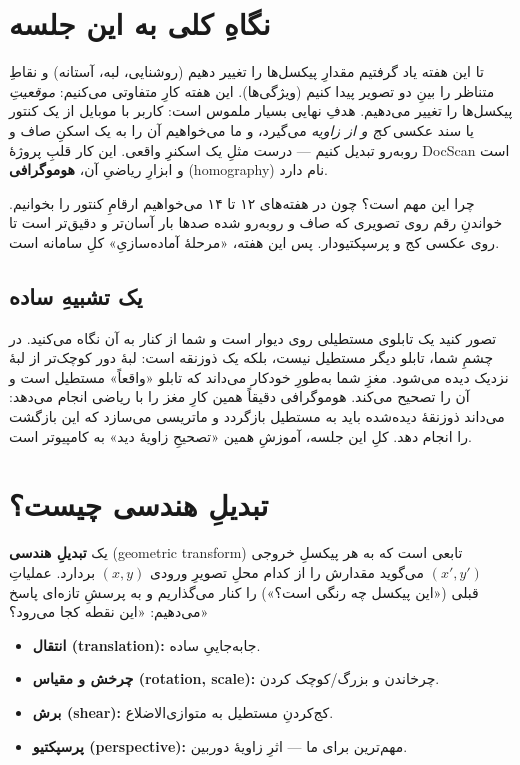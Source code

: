 \documentclass[12pt,a4paper]{article}
\begin{document}

\section*{نگاهِ کلی به این جلسه}

تا این هفته یاد گرفتیم مقدارِ پیکسل‌ها را تغییر دهیم (روشنایی، لبه، آستانه) و نقاطِ متناظر را بینِ دو تصویر پیدا کنیم (ویژگی‌ها). این هفته کارِ متفاوتی می‌کنیم: \emph{موقعیتِ} پیکسل‌ها را تغییر می‌دهیم. هدفِ نهایی بسیار ملموس است: کاربر با موبایل از یک کنتور یا سند عکسی \emph{کج و از زاویه} می‌گیرد، و ما می‌خواهیم آن را به یک اسکنِ صاف و روبه‌رو تبدیل کنیم — درست مثلِ یک اسکنرِ واقعی. این کار قلبِ پروژهٔ DocScan است و ابزارِ ریاضیِ آن، \textbf{هوموگرافی} (homography) نام دارد.

\begin{yaddasht}
چرا این مهم است؟ چون در هفته‌های ۱۲ تا ۱۴ می‌خواهیم ارقامِ کنتور را بخوانیم. خواندنِ رقم روی تصویری که صاف و روبه‌رو شده صدها بار آسان‌تر و دقیق‌تر است تا روی عکسی کج و پرسپکتیودار. پس این هفته، «مرحلهٔ آماده‌سازیِ» کلِ سامانه است.
\end{yaddasht}

\subsection*{یک تشبیهِ ساده}

تصور کنید یک تابلوی مستطیلی روی دیوار است و شما از کنار به آن نگاه می‌کنید. در چشمِ شما، تابلو دیگر مستطیل نیست، بلکه یک ذوزنقه است: لبهٔ دور کوچک‌تر از لبهٔ نزدیک دیده می‌شود. مغزِ شما به‌طورِ خودکار می‌داند که تابلو «واقعاً» مستطیل است و آن را تصحیح می‌کند. هوموگرافی دقیقاً همین کارِ مغز را با ریاضی انجام می‌دهد: می‌داند ذوزنقهٔ دیده‌شده باید به مستطیل بازگردد و ماتریسی می‌سازد که این بازگشت را انجام دهد. کلِ این جلسه، آموزشِ همین «تصحیحِ زاویهٔ دید» به کامپیوتر است.

\section{تبدیلِ هندسی چیست؟}

یک \textbf{تبدیلِ هندسی} (geometric transform) تابعی است که به هر پیکسلِ خروجی $(x',y')$ می‌گوید مقدارش را از کدام محلِ تصویرِ ورودی $(x,y)$ بردارد. عملیاتِ قبلی («این پیکسل چه رنگی است؟») را کنار می‌گذاریم و به پرسشِ تازه‌ای پاسخ می‌دهیم: «این نقطه کجا می‌رود؟»

\begin{itemize}
  \item \textbf{انتقال (translation):} جابه‌جاییِ ساده.
  \item \textbf{چرخش و مقیاس (rotation, scale):} چرخاندن و بزرگ/کوچک کردن.
  \item \textbf{برش (shear):} کج‌کردنِ مستطیل به متوازی‌الاضلاع.
  \item \textbf{پرسپکتیو (perspective):} مهم‌ترین برای ما — اثرِ زاویهٔ دوربین.
\end{itemize}
\end{document}
